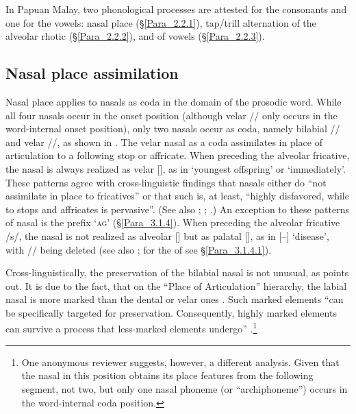 In Papuan Malay, two phonological processes are attested for the consonants and one for the vowels: nasal place  (§\ref{Para_2.2.1}), tap/trill alternation of the alveolar rhotic (§\ref{Para_2.2.2}), and  of vowels (§\ref{Para_2.2.3}).


\subsection{Nasal place {assimilation}\label{Para_2.2.1}}
Nasal place  applies to nasals as coda in the domain of the prosodic word. While all four nasals occur in the onset position (although velar // only occurs in the word-internal onset position), only two nasals occur as coda, namely bilabial // and velar //, as shown in . The velar nasal as a coda assimilates in place of articulation to a following stop or affricate. When preceding the alveolar fricative, the nasal is always realized as velar [], as in  ‘youngest offspring’ or  ‘immediately’. These patterns agree with  cross-linguistic findings that nasals either do “not assimilate in place to fricatives” or that such  is, at least, “highly disfavored, while  to stops and affricates is pervasive”. (See also \citealt[146--147]{deLacy.2006}; \citealt[554]{Zsiga.2006}; \citealt{Blust.2012}.) An exception to these patterns of nasal  is the prefix  ‘\textsc{ag}’ (§\ref{Para_3.1.4}). When preceding the alveolar fricative /s/, the nasal is not realized as alveolar [] but as palatal [], as in  [–] ‘disease’, with // being deleted (see also \citealt{Blust.2012}; for the  of  see §\ref{Para_3.1.4.1}).


Cross-linguistically, the preservation of the bilabial nasal is not unusual, as \citet[78–207]{deLacy.2006} points out. It is due to the fact, that on the “Place of Articulation” hierarchy, the labial nasal is more marked than the dental or velar ones \citep[129]{deLacy.2006}. Such marked elements “can be specifically targeted for preservation. Consequently, highly marked elements can survive a process that less-marked elements undergo” \citep[146]{deLacy.2006}.\footnote{One anonymous reviewer suggests, however, a different analysis. Given that the nasal in this position obtains its place features from the following segment, not two, but only one nasal phoneme (or ``archiphoneme'') occurs in the word-internal coda position.}

